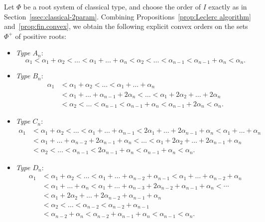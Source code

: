 \documentclass[10pt,a4paper]{amsart}
\numberwithin{equation}{section}
\begin{document}
Let $\Phi$ be a root system of classical type, and choose the order of $I$ exactly as in Section~\ref{ssec:classical-2param}. Combining Propositions~\ref{prop:Leclerc algorithm} and~\ref{prop:fin.convex}, we obtain the following explicit convex orders on the sets~$\Phi^+$ of positive roots:
\begin{itemize}\itemsep=0pt
\item
\emph{Type $A_{n}$}:
\begin{equation}\label{eq:A_order}
 \alpha_{1} < \alpha_{1} + \alpha_{2} < \dots < \alpha_{1} + \dots + \alpha_{n} < \alpha_{2} <
 \dots < \alpha_{n-1} < \alpha_{n-1} + \alpha_{n} < \alpha_{n}.
\end{equation}

\item
\emph{Type $B_{n}$}:
\begin{align}
\alpha_{1} &{}< \alpha_{1} + \alpha_{2} < \dots < \alpha_{1} + \dots + \alpha_{n}\nonumber \\
 & {} < \alpha_{1} + \dots + \alpha_{n-1} + 2\alpha_{n} < \dots
 <\alpha_{1} + 2\alpha_{2} + \dots + 2\alpha_{n} \nonumber \\
 &{}<\alpha_{2} < \dots < \alpha_{n-1} < \alpha_{n-1} + \alpha_{n} < \alpha_{n-1} + 2\alpha_{n} < \alpha_{n}.\label{eq:B_order}
\end{align}

\item
\emph{Type $C_{n}$}:
\begin{align}
 \alpha_{1} &{}< \alpha_{1} + \alpha_{2} < \dots < \alpha_{1} + \dots + \alpha_{n-1} <
 2\alpha_{1} + \dots + 2\alpha_{n-1} + \alpha_{n} < \alpha_{1} + \dots + \alpha_{n} \nonumber\\
 &{}< \alpha_{1} + \dots + \alpha_{n-2} + 2\alpha_{n-1} + \alpha_{n} < \dots <
 \alpha_{1} + 2\alpha_{2} + \dots + 2\alpha_{n-1} + \alpha_{n} \nonumber\\
 &{}<\alpha_{2} < \dots < \alpha_{n-1} < 2\alpha_{n-1} + \alpha_{n} < \alpha_{n-1} + \alpha_{n} < \alpha_{n}.\label{eq:C_order}
\end{align}

\item
\emph{Type $D_{n}$}:
\begin{align}
 \alpha_{1} & < \alpha_{1} + \alpha_{2} < \dots < \alpha_{1} + \dots + \alpha_{n-2}+\alpha_{n-1} <
 \alpha_{1} +\dots + \alpha_{n-2} + \alpha_{n} \nonumber\\
 & < \alpha_{1} + \dots + \alpha_{n}< \alpha_{1} + \dots + \alpha_{n-3} + 2\alpha_{n-2} + \alpha_{n-1} + \alpha_{n} < \cdots\nonumber \\
 & < \alpha_{1} + 2\alpha_{2} + \dots + 2\alpha_{n-2} + \alpha_{n-1} + \alpha_{n} \nonumber\\
 &
 < \alpha_{2} < \dots < \alpha_{n-2}<\alpha_{n-2}+\alpha_{n-1}\nonumber\\
 & <\alpha_{n-2}+\alpha_{n}< \alpha_{n-2} + \alpha_{n-1} + \alpha_{n} <\alpha_{n-1}<\alpha_{n}.\label{eq:D_order}
\end{align}
\end{itemize}
\end{document}
